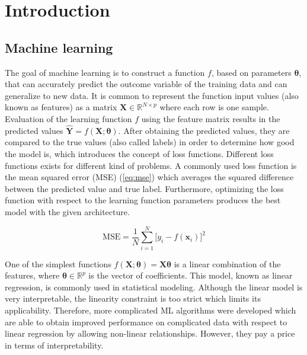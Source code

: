 \chapter{Introduction}


\section{Machine learning}

The goal of machine learning is to construct a function $f$, based on parameters
$\pmb{\theta}$, that can accurately predict the outcome variable of the training
data and can generalize to new data.\cite{hastie2009elements} It is common to represent the function input
values (also known as features) as a matrix $\mathbf{X} \in \mathbb{R}^{N \times p}$ where
each row is one sample. Evaluation of the learning function $f$ using the feature matrix
results in the predicted values $\mathbf{\hat{Y}} = f(\mathbf{X}; \pmb{\theta})$. After
obtaining the predicted values, they are compared to the true values (also called labels)
in order to determine how good the model is, which introduces the concept of loss functions.
Different loss functions exists for different kind of problems.\cite{wang2020comprehensive}
A commonly used loss function is the mean squared error (MSE) (\cref{eq:mse})
which averages the squared difference between the predicted value and true label.
Furthermore, optimizing the loss function with respect to the learning function
parameters produces the best model with the given architecture.\cite{hastie2009elements}


\begin{equation}
	\label{eq:mse}
	\text{MSE} = \frac{1}{N} \sum_{i=1}^N \big[y_i - f(\mathbf{x}_i)\big]^2
\end{equation}


One of the simplest functions $f\left(\mathbf{X}; \pmb{\theta}\right) = \mathbf{X}\pmb{\theta}$
is a linear combination of the features, where $\pmb{\theta} \in \mathbb{R}^p$
is the vector of coefficients. This model, known as linear regression, is commonly
used in statistical modeling.\cite{kutner2005applied} Although the linear model is
very interpretable, the linearity constraint is too strict which limits its
applicability. Therefore, more complicated ML algorithms were developed which are
able to obtain improved performance on complicated data with respect to linear
regression by allowing non-linear relationships.\cite{deng2012mnist} However,
they pay a price in terms of interpretability.\cite{fan2021interpretability}


